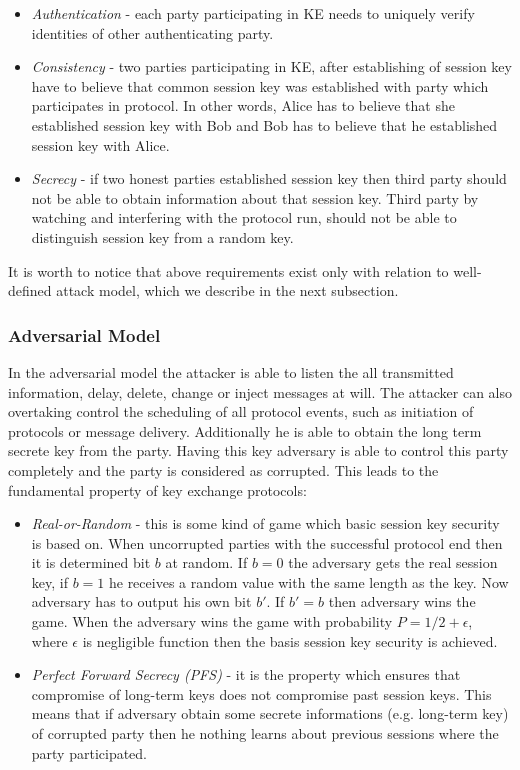 \documentclass[11pt,titlepage]{article}
\theoremstyle{plain}
\begin{document}
\begin{itemize}
	\item \textit{Authentication} - each party participating in KE needs to uniquely verify identities of other authenticating party.
	\item \textit{Consistency} - two parties participating in KE, after establishing of session key have to believe that common session key was established with party which participates in protocol. In other words, Alice has to believe that she established session key with Bob and Bob has to believe that he established session key with Alice.
	\item \textit{Secrecy} - if two honest parties established session key then third party should not be able to obtain information about that session key. Third party by watching and interfering with the protocol run, should not be able to distinguish session key from a random key.
\end{itemize}

It is worth to notice that above requirements exist only with relation to well-defined attack model, which we describe in the next subsection.

\subsubsection{Adversarial Model}
In the adversarial model the attacker is able to listen the all transmitted information, delay, delete, change or inject messages at will. The attacker can also overtaking control the scheduling of all protocol events, such as initiation of protocols or message delivery. Additionally he is able to obtain the long term secrete key from the party. Having this key adversary is able to  control this party completely and the party is considered as corrupted. This leads to the fundamental property of key exchange protocols:

\begin{itemize}
	\item \textit{Real-or-Random} - this is some kind of game which basic session key security is based on. When uncorrupted parties with the successful protocol end then it is determined bit $b$ at random. If $b=0$ the adversary gets the real session key, if $b = 1$ he receives a random value with the same length as the key. Now adversary has to output his own bit $b'$. If $b' = b$ then adversary wins the game. When the adversary wins the game with probability $P = 1/2+\epsilon$, where $\epsilon$ is negligible function then the basis session key security is achieved.
	\item \textit{Perfect Forward Secrecy (PFS)} - it is the property which ensures that compromise of long-term keys does not compromise past session keys. This means that if adversary obtain some secrete informations (e.g. long-term key) of corrupted party then he nothing learns about previous sessions where the party participated.
\end{itemize}
\end{document}
